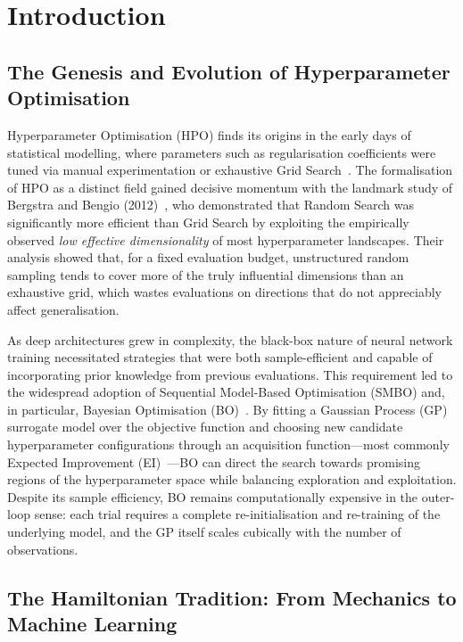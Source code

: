 \documentclass[12pt,a4paper]{article}
\begin{document}
\section{Introduction}

\subsection{The Genesis and Evolution of Hyperparameter Optimisation}

Hyperparameter Optimisation (HPO) finds its origins in the early days
of statistical modelling, where parameters such as regularisation
coefficients were tuned via manual experimentation or exhaustive Grid
Search~\cite{lecun2015,raiaan2024}.  The formalisation of HPO as a
distinct field gained decisive momentum with the landmark study of
Bergstra and Bengio (2012)~\cite{bergstra2012}, who demonstrated that
Random Search was significantly more efficient than Grid Search by
exploiting the empirically observed \emph{low effective dimensionality}
of most hyperparameter landscapes.  Their analysis showed that, for a
fixed evaluation budget, unstructured random sampling tends to cover
more of the truly influential dimensions than an exhaustive grid, which
wastes evaluations on directions that do not appreciably affect
generalisation.

As deep architectures grew in complexity, the black-box nature of
neural network training necessitated strategies that were both
sample-efficient and capable of incorporating prior knowledge from
previous evaluations.  This requirement led to the widespread adoption
of Sequential Model-Based Optimisation (SMBO) and, in particular,
Bayesian Optimisation (BO)~\cite{snoek2012}.  By fitting a Gaussian
Process (GP) surrogate model over the objective function and choosing
new candidate hyperparameter configurations through an acquisition
function—most commonly Expected Improvement (EI)~\cite{mockus1975}—BO
can direct the search towards promising regions of the hyperparameter
space while balancing exploration and exploitation.  Despite its
sample efficiency, BO remains computationally expensive in the
outer-loop sense: each trial requires a complete re-initialisation and
re-training of the underlying model, and the GP itself scales
cubically with the number of observations.

\subsection{The Hamiltonian Tradition: From Mechanics to Machine Learning}
\end{document}
